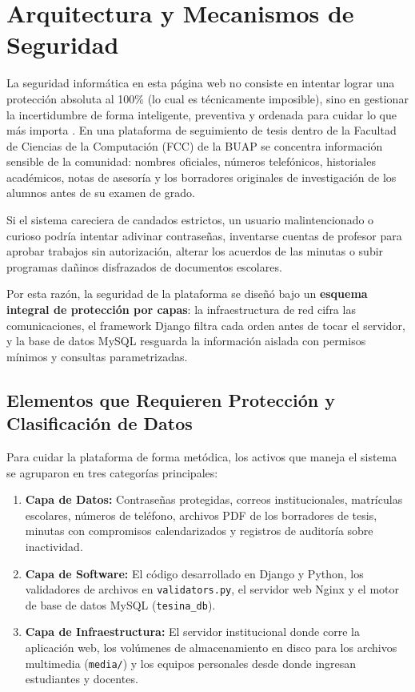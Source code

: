 \section{Arquitectura y Mecanismos de Seguridad}
\label{sec:seguridad_sistema}

La seguridad informática en esta página web no consiste en intentar lograr una protección absoluta al 100\% (lo cual es técnicamente imposible), sino en gestionar la incertidumbre de forma inteligente, preventiva y ordenada para cuidar lo que más importa \parencite{ferraiolo2007}. En una plataforma de seguimiento de tesis dentro de la Facultad de Ciencias de la Computación (FCC) de la BUAP se concentra información sensible de la comunidad: nombres oficiales, números telefónicos, historiales académicos, notas de asesoría y los borradores originales de investigación de los alumnos antes de su examen de grado.

Si el sistema careciera de candados estrictos, un usuario malintencionado o curioso podría intentar adivinar contraseñas, inventarse cuentas de profesor para aprobar trabajos sin autorización, alterar los acuerdos de las minutas o subir programas dañinos disfrazados de documentos escolares.

Por esta razón, la seguridad de la plataforma se diseñó bajo un \textbf{esquema integral de protección por capas}: la infraestructura de red cifra las comunicaciones, el framework Django filtra cada orden antes de tocar el servidor, y la base de datos MySQL resguarda la información aislada con permisos mínimos y consultas parametrizadas.

\subsection{Elementos que Requieren Protección y Clasificación de Datos}
\label{subsec:elementos_proteger}

Para cuidar la plataforma de forma metódica, los activos que maneja el sistema se agruparon en tres categorías principales:

\begin{enumerate}
    \item \textbf{Capa de Datos:} Contraseñas protegidas, correos institucionales, matrículas escolares, números de teléfono, archivos PDF de los borradores de tesis, minutas con compromisos calendarizados y registros de auditoría sobre inactividad.
    \item \textbf{Capa de Software:} El código desarrollado en Django y Python, los validadores de archivos en \texttt{validators.py}, el servidor web Nginx y el motor de base de datos MySQL (\texttt{tesina\_db}).
    \item \textbf{Capa de Infraestructura:} El servidor institucional donde corre la aplicación web, los volúmenes de almacenamiento en disco para los archivos multimedia (\texttt{media/}) y los equipos personales desde donde ingresan estudiantes y docentes.
\end{enumerate}

